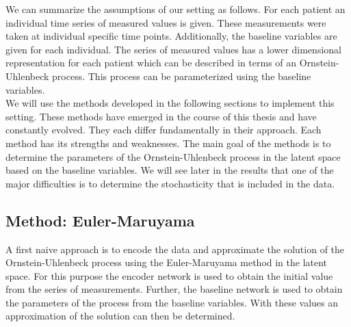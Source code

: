 \documentclass[11pt,titlepage]{article}
\theoremstyle{definition}
\theoremstyle{remark}
\begin{document}
	We can summarize the assumptions of our setting as follows. For each patient an individual time series of measured values is given. These measurements were taken at individual specific time points. Additionally, the baseline variables are given for each individual. The series of measured values has a lower dimensional representation for each patient which can be described in terms of an Ornstein-Uhlenbeck process. This process can be parameterized using the baseline variables.\\
	We will use the methods developed in the following sections to implement this setting. These methods have emerged in the course of this thesis and have constantly evolved. They each differ fundamentally in their approach. Each method has its strengths and weaknesses. The main goal of the methods is to determine the parameters of the Ornstein-Uhlenbeck process in the latent space based on the baseline variables. We will see later in the results that one of the major difficulties is to determine the stochasticity that is included in the data.
	
	\clearpage
	\subsection{Method: Euler-Maruyama}\label{sec Eul Mar}
	
	A first naive approach is to encode the data and approximate the solution of the Ornstein-Uhlenbeck process using the Euler-Maruyama method in the latent space. For this purpose the encoder network is used to obtain the initial value from the series of measurements. Further, the baseline network is used to obtain the parameters of the process from the baseline variables. With these values an approximation of the solution can then be determined.\\
	
\end{document}
